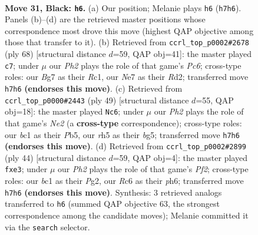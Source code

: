 \documentclass[11pt]{article}
\begin{document}
\clearpage

\begin{figure}[p]\centering
\begin{subfigure}{0.46\textwidth}\centering
\resizebox{\linewidth}{!}{%
\newchessgame
\chessboard[
  setfen={r5k1/p3n1bp/Ppr5/5pPR/4pP2/8/4B3/1RB1K3 b - - 1 31},
  showmover=false,
  pgfstyle=straightmove, color=movearrow, markmove={h7-h6}
]}
\caption{}
\end{subfigure}\hfill
\begin{subfigure}{0.46\textwidth}\centering
\resizebox{\linewidth}{!}{%
\newchessgame
\chessboard[
  setfen={1rb5/5kp1/r1P5/1p1p4/3N1p1p/5P1P/3R1KP1/2R5 w - - 1 35},
  showmover=false,
  pgfstyle=straightmove, color=movearrow, markmove={c6-c7}
]}
\caption{}
\end{subfigure}
\\[4pt]
\begin{subfigure}{0.46\textwidth}\centering
\resizebox{\linewidth}{!}{%
\newchessgame
\chessboard[
  setfen={1r4k1/4np2/p3p1p1/1pR1P1B1/3P3P/3B4/P2K1Pb1/8 b - - 2 25},
  showmover=false,
  pgfstyle=straightmove, color=movearrow, markmove={e7-c6}
]}
\caption{}
\end{subfigure}\hfill
\begin{subfigure}{0.46\textwidth}\centering
\resizebox{\linewidth}{!}{%
\newchessgame
\chessboard[
  setfen={r1b3k1/5pb1/p2B2pp/8/7P/1P2rN2/P4PP1/2R3K1 w - - 0 23},
  showmover=false,
  pgfstyle=straightmove, color=movearrow, markmove={f2-e3}
]}
\caption{}
\end{subfigure}
\caption{\textbf{Move 31, Black: \texttt{h6}.} (a) Our position; Melanie plays \texttt{h6} (\texttt{h7h6}). Panels (b)--(d) are the retrieved master positions whose correspondence most drove this move (highest QAP objective among those that transfer to it). (b) Retrieved from \texttt{ccrl\_top\_p0002\#2678} (ply 68) [structural distance $d$=59, QAP obj=41]: the master played \texttt{c7}; under $\mu$ our \emph{Ph2} plays the role of that game's \emph{Pc6}; cross-type roles: our \emph{B}g7 as their \emph{R}c1, our \emph{N}e7 as their \emph{R}d2; transferred move \texttt{h7h6} \textbf{(endorses this move)}. (c) Retrieved from \texttt{ccrl\_top\_p0000\#2443} (ply 49) [structural distance $d$=55, QAP obj=18]: the master played \texttt{Nc6}; under $\mu$ our \emph{Ph2} plays the role of that game's \emph{Ne2} (a \textbf{cross-type} correspondence); cross-type roles: our \emph{b}c1 as their \emph{P}b5, our \emph{r}h5 as their \emph{b}g5; transferred move \texttt{h7h6} \textbf{(endorses this move)}. (d) Retrieved from \texttt{ccrl\_top\_p0002\#2899} (ply 44) [structural distance $d$=59, QAP obj=4]: the master played \texttt{fxe3}; under $\mu$ our \emph{Ph2} plays the role of that game's \emph{Pf2}; cross-type roles: our \emph{b}c1 as their \emph{P}g2, our \emph{R}c6 as their \emph{p}h6; transferred move \texttt{h7h6} \textbf{(endorses this move)}. Synthesis: 3 retrieved analogs transferred to \texttt{h6} (summed QAP objective 63, the strongest correspondence among the candidate moves); Melanie committed it via the \texttt{search} selector.}
\label{fig:thought-m61}
\end{figure}
\end{document}
